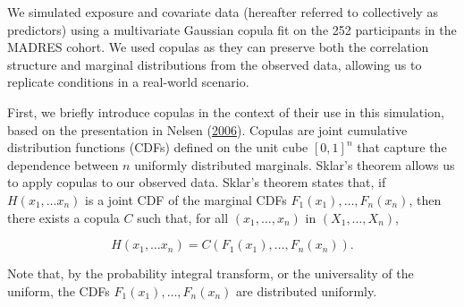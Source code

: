 \documentclass[12pt, twoside]{amherstthesis}
\begin{document}
We simulated exposure and covariate data (hereafter referred to collectively as predictors) using a multivariate Gaussian copula fit on the 252 participants in the MADRES cohort. We used copulas as they can preserve both the correlation structure and marginal distributions from the observed data, allowing us to replicate conditions in a real-world scenario.

First, we briefly introduce copulas in the context of their use in this simulation, based on the presentation in Nelsen (\protect\hyperlink{ref-nelsen_introduction_2006}{2006}). Copulas are joint cumulative distribution functions (CDFs) defined on the unit cube \([0,1]^n\) that capture the dependence between \(n\) uniformly distributed marginals. Sklar's theorem allows us to apply copulas to our observed data. Sklar's theorem states that, if \(H(x_1, \dots x_n)\) is a joint CDF of the marginal CDFs \(F_1(x_1), \dots, F_n(x_n)\), then there exists a copula \(C\) such that, for all \((x_1, \dots, x_n)\) in \((X_1, \dots, X_n)\),

\[
H(x_1, \dots x_n)=C(F_1(x_1), \dots, F_n(x_n)).
\]

\noindent Note that, by the probability integral transform, or the universality of the uniform, the CDFs \(F_1(x_1), \dots, F_n(x_n)\) are distributed uniformly.
\end{document}
